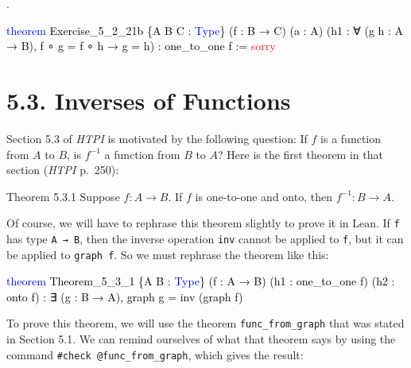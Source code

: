 \documentclass[
  letterpaper,
  DIV=11,
  numbers=noendperiod]{scrreprt}
\newenvironment{Shaded}{\begin{snugshade}}{\end{snugshade}}
\newcommand{\ConstantTok}[1]{\textcolor[rgb]{0.56,0.35,0.01}{#1}}
\newcommand{\KeywordTok}[1]{\textcolor[rgb]{0.00,0.23,0.31}{#1}}
\newcommand{\NormalTok}[1]{\textcolor[rgb]{0.00,0.23,0.31}{#1}}
\renewcommand{\NormalTok}[1]{\textcolor[HTML]{000000}{#1}}
\renewcommand{\KeywordTok}[1]{\textcolor[HTML]{0000FF}{#1}}
\renewcommand{\ConstantTok}[1]{\textcolor[HTML]{DC143C}{#1}}
\newcommand{\nobreakShaded}{\renewenvironment{Shaded}
	{\begin{tcolorbox}[frame hidden, enhanced, interior hidden, boxrule=0pt,
		borderline west={3pt}{0pt}{shadecolor}, sharp corners]}
	{\end{tcolorbox}}}
\newenvironment{numex}[1]
	{\begin{minipage}[t]{0.04\textwidth}\vspace{8pt}{#1}.
		\end{minipage}\nobreakShaded\begin{minipage}[t]{0.96\textwidth}\vspace{0pt}}
	{\end{minipage}}
\theoremstyle{remark}
\begin{document}
\begin{numex}{10}

\begin{Shaded}
\begin{Highlighting}[]
\KeywordTok{theorem}\NormalTok{ Exercise\_5\_2\_21b \{A B C : }\KeywordTok{Type}\NormalTok{\} (f : B → C) (a : A)}
\NormalTok{    (h1 : ∀ (g h : A → B), f ∘ g = f ∘ h → g = h) :}
\NormalTok{    one\_to\_one f := }\ConstantTok{sorry}
\end{Highlighting}
\end{Shaded}

\end{numex}

\hypertarget{inverses-of-functions}{%
\section{5.3. Inverses of Functions}\label{inverses-of-functions}}

Section 5.3 of \emph{HTPI} is motivated by the following question: If
\(f\) is a function from \(A\) to \(B\), is \(f^{-1}\) a function from
\(B\) to \(A\)? Here is the first theorem in that section (\emph{HTPI}
p.~250):

\begin{nthm}{Theorem 5.3.1}
Suppose \(f : A \to B\). If \(f\) is one-to-one and onto, then
\(f^{-1} : B \to A\).

\end{nthm}

Of course, we will have to rephrase this theorem slightly to prove it in
Lean. If \texttt{f} has type \texttt{A\ →\ B}, then the inverse
operation \texttt{inv} cannot be applied to \texttt{f}, but it can be
applied to \texttt{graph\ f}. So we must rephrase the theorem like this:

\begin{Shaded}
\begin{Highlighting}[]
\KeywordTok{theorem}\NormalTok{ Theorem\_5\_3\_1 \{A B : }\KeywordTok{Type}\NormalTok{\}}
\NormalTok{    (f : A → B) (h1 : one\_to\_one f) (h2 : onto f) :}
\NormalTok{    ∃ (g : B → A), graph g = inv (graph f)}
\end{Highlighting}
\end{Shaded}

To prove this theorem, we will use the theorem
\texttt{func\_from\_graph} that was stated in Section 5.1. We can remind
ourselves of what that theorem says by using the command
\texttt{\#check\ @func\_from\_graph}, which gives the result:
\end{document}
